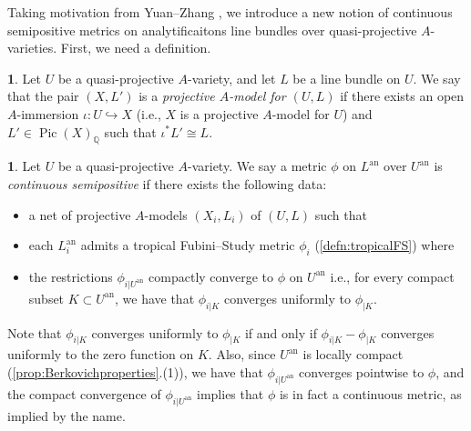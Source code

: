 \documentclass[11pt,reqno]{amsart}
\newcommand{\mQ}{\mathbb{Q}}
\theoremstyle{theorem}
\numberwithin{equation}{subsection}
\numberwithin{equation}{subsection}
\theoremstyle{definition}
\newtheorem{definition}[subsubsection]{\text{Definition}}
\theoremstyle{remark}
\numberwithin{equation}{subsubsection} \numberwithin{figure}{section}
\DeclareMathOperator{\an}{an}
\DeclareMathOperator{\Pic}{Pic}
\newcommand{\cdef}[1]{\textsf{\textit{#1}}}
\DeclareMathOperator{\FS}{FS}
\DeclareMathOperator{\PSH}{PSH}
\DeclareMathOperator{\CPSH}{CPSH}
\begin{document}
Taking motivation from Yuan--Zhang \cite{YuanZhang:AdelicLineBundles}, we introduce a new notion of continuous semipositive metrics on analytificaitons line bundles over quasi-projective $A$-varieties. 
First, we need a definition.  

\begin{definition}\label{defn:projectivemodel}
Let $U$ be a quasi-projective $A$-variety, and let $L$ be a line bundle on $U$. 
We say that the pair $(X,L')$ is a \cdef{projective $A$-model for $(U,L)$} if there exists an open $A$-immersion $\iota\colon U \hookrightarrow X$ (i.e., $X$ is a projective $A$-model for $U$) and $L' \in \Pic(X)_{\mQ}$ such that $\iota^*L' \cong L$. 
\end{definition}

\begin{definition}\label{defn:continuous_semipositive}
Let $U$ be a quasi-projective $A$-variety. 
We say a metric $\phi$ on $L^{\an}$ over $U^{\an}$ is \cdef{continuous semipositive} if there exists the following data:
\begin{itemize}
\item a net of projective $A$-models $(X_i,L_i)$ of $(U,L) $ such that
\item each $L_i^{\an}$ admits a tropical Fubini--Study metric $\phi_i$ (\autoref{defn:tropicalFS}) where
\item the restrictions $\phi_{i|U^{\an}}$ compactly converge to $\phi$ on $U^{\an}$  i.e., for every compact subset $K\subset U^{\an}$, we have that $\phi_{i|K}$ converges uniformly to $\phi_{|K}$. 
\end{itemize}
Note that $\phi_{i|K}$ converges uniformly to $\phi_{|K}$ if and only if $\phi_{i|K} - \phi_{|K}$ converges uniformly to the zero function on $K$. 
Also, since $U^{\an}$ is locally compact (\autoref{prop:Berkovichproperties}.(1)), we have that $\phi_{i|U^{\an}}$ converges pointwise to $\phi$, and the compact convergence of $\phi_{i|U^{\an}}$ implies that $\phi$ is in fact a continuous metric, as implied by the name. 
\end{definition}
\end{document}
